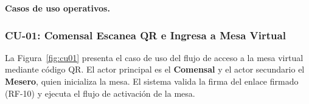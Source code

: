 \begingroup
{}
\renewcommand{\arraystretch}{0.95}
\setlength{\tabcolsep}{2pt}

\newpage

\noindent\textbf{Casos de uso operativos.}

\subsubsection{CU-01: Comensal Escanea QR e Ingresa a Mesa Virtual}

La Figura~\ref{fig:cu01} presenta el caso de uso del flujo de acceso a la mesa virtual mediante
código QR. El actor principal es el \textbf{Comensal} y el actor secundario el
\textbf{Mesero}, quien inicializa la mesa. El sistema valida la firma del enlace
firmado (RF-10) y ejecuta el flujo de activación de la mesa.


